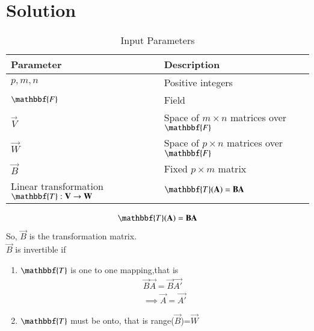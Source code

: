 \documentclass[journal,12pt,twocolumn]{IEEEtran}
\begin{document}
\section{Solution}
\begin{table}[!ht]
\centering
\begin{tabular}{|p{3.7cm}|p{4cm}|}
\hline
\textbf{Parameter}&\textbf{Description}\\
\hline
$p,m,n$&Positive integers\\
\hline
$\mathbbf{F}$&Field\\
\hline
$\vec{V}$&Space of $m\times n$ matrices over $\mathbbf{F}$\\
\hline
$\vec{W}$&Space of $p\times n$ matrices over $\mathbbf{F}$\\
\hline
$\vec{B}$&Fixed $p\times m$ matrix\\
\hline
Linear transformation  $\mathbbf{T}:\vec{V} \rightarrow \vec{W}$&$ \mathbbf{T}(\vec{A})=\vec{B}\vec{A}$\\
\hline
\end{tabular}
\caption{Input Parameters}
\end{table}
\begin{align}
    \mathbbf{T}(\vec{A})=\vec{B}\vec{A}
\end{align}
So, $\vec{B}$ is the transformation matrix.\\
$\vec{B}$ is invertible if
\begin{enumerate}
    \item $\mathbbf{T}$ is one to one mapping,that is
    \begin{align}
       \vec{B}\vec{A}=\vec{B}\vec{A'}\\
       \implies \vec{A}=\vec{A'}
    \end{align}
    \item $\mathbbf{T}$ must be onto, that is range($\vec{B}$)=$\vec{W}$ 
\end{enumerate}
\end{document}
